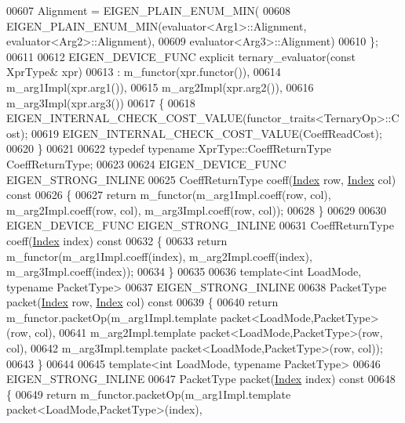 \begin{DoxyCode}
00607     Alignment = EIGEN\_PLAIN\_ENUM\_MIN(
00608         EIGEN\_PLAIN\_ENUM\_MIN(evaluator<Arg1>::Alignment, evaluator<Arg2>::Alignment),
00609         evaluator<Arg3>::Alignment)
00610   \};
00611 
00612   EIGEN\_DEVICE\_FUNC \textcolor{keyword}{explicit} ternary\_evaluator(\textcolor{keyword}{const} XprType& xpr)
00613     : m\_functor(xpr.functor()),
00614       m\_arg1Impl(xpr.arg1()), 
00615       m\_arg2Impl(xpr.arg2()), 
00616       m\_arg3Impl(xpr.arg3())  
00617   \{
00618     EIGEN\_INTERNAL\_CHECK\_COST\_VALUE(functor\_traits<TernaryOp>::Cost);
00619     EIGEN\_INTERNAL\_CHECK\_COST\_VALUE(CoeffReadCost);
00620   \}
00621 
00622   \textcolor{keyword}{typedef} \textcolor{keyword}{typename} XprType::CoeffReturnType CoeffReturnType;
00623 
00624   EIGEN\_DEVICE\_FUNC EIGEN\_STRONG\_INLINE
00625   CoeffReturnType coeff(\hyperlink{namespace_eigen_a62e77e0933482dafde8fe197d9a2cfde}{Index} row, \hyperlink{namespace_eigen_a62e77e0933482dafde8fe197d9a2cfde}{Index} col)\textcolor{keyword}{ const}
00626 \textcolor{keyword}{  }\{
00627     \textcolor{keywordflow}{return} m\_functor(m\_arg1Impl.coeff(row, col), m\_arg2Impl.coeff(row, col), m\_arg3Impl.coeff(row, col));
00628   \}
00629 
00630   EIGEN\_DEVICE\_FUNC EIGEN\_STRONG\_INLINE
00631   CoeffReturnType coeff(\hyperlink{namespace_eigen_a62e77e0933482dafde8fe197d9a2cfde}{Index} index)\textcolor{keyword}{ const}
00632 \textcolor{keyword}{  }\{
00633     \textcolor{keywordflow}{return} m\_functor(m\_arg1Impl.coeff(index), m\_arg2Impl.coeff(index), m\_arg3Impl.coeff(index));
00634   \}
00635 
00636   \textcolor{keyword}{template}<\textcolor{keywordtype}{int} LoadMode, \textcolor{keyword}{typename} PacketType>
00637   EIGEN\_STRONG\_INLINE
00638   PacketType packet(\hyperlink{namespace_eigen_a62e77e0933482dafde8fe197d9a2cfde}{Index} row, \hyperlink{namespace_eigen_a62e77e0933482dafde8fe197d9a2cfde}{Index} col)\textcolor{keyword}{ const}
00639 \textcolor{keyword}{  }\{
00640     \textcolor{keywordflow}{return} m\_functor.packetOp(m\_arg1Impl.template packet<LoadMode,PacketType>(row, col),
00641                               m\_arg2Impl.template packet<LoadMode,PacketType>(row, col),
00642                               m\_arg3Impl.template packet<LoadMode,PacketType>(row, col));
00643   \}
00644 
00645   \textcolor{keyword}{template}<\textcolor{keywordtype}{int} LoadMode, \textcolor{keyword}{typename} PacketType>
00646   EIGEN\_STRONG\_INLINE
00647   PacketType packet(\hyperlink{namespace_eigen_a62e77e0933482dafde8fe197d9a2cfde}{Index} index)\textcolor{keyword}{ const}
00648 \textcolor{keyword}{  }\{
00649     \textcolor{keywordflow}{return} m\_functor.packetOp(m\_arg1Impl.template packet<LoadMode,PacketType>(index),

\end{DoxyCode}
